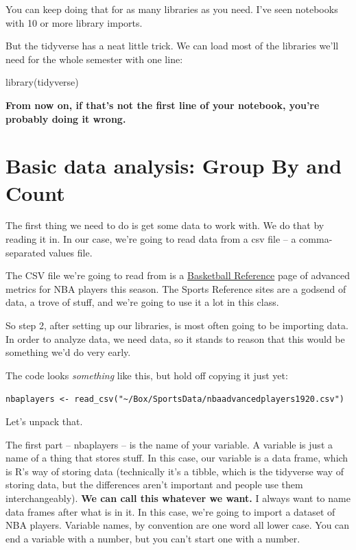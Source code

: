 \documentclass[
]{book}
\newenvironment{Shaded}{\begin{snugshade}}{\end{snugshade}}
\newcommand{\FunctionTok}[1]{\textcolor[rgb]{0.00,0.00,0.00}{#1}}
\newcommand{\NormalTok}[1]{#1}
\begin{document}
You can keep doing that for as many libraries as you need. I've seen notebooks with 10 or more library imports.

But the tidyverse has a neat little trick. We can load most of the libraries we'll need for the whole semester with one line:

\begin{Shaded}
\begin{Highlighting}[]
\FunctionTok{library}\NormalTok{(tidyverse)}
\end{Highlighting}
\end{Shaded}

\textbf{From now on, if that's not the first line of your notebook, you're probably doing it wrong.}

\hypertarget{basic-data-analysis-group-by-and-count}{%
\section{Basic data analysis: Group By and Count}\label{basic-data-analysis-group-by-and-count}}

The first thing we need to do is get some data to work with. We do that by reading it in. In our case, we're going to read data from a csv file -- a comma-separated values file.

The CSV file we're going to read from is a \href{https://www.basketball-reference.com/leagues/NBA_2020_advanced.html}{Basketball Reference} page of advanced metrics for NBA players this season. The Sports Reference sites are a godsend of data, a trove of stuff, and we're going to use it a lot in this class.

So step 2, after setting up our libraries, is most often going to be importing data. In order to analyze data, we need data, so it stands to reason that this would be something we'd do very early.

The code looks \emph{something} like this, but hold off copying it just yet:

\texttt{nbaplayers\ \textless{}-\ read\_csv("\textasciitilde{}/Box/SportsData/nbaadvancedplayers1920.csv")}

Let's unpack that.

The first part -- nbaplayers -- is the name of your variable. A variable is just a name of a thing that stores stuff. In this case, our variable is a data frame, which is R's way of storing data (technically it's a tibble, which is the tidyverse way of storing data, but the differences aren't important and people use them interchangeably). \textbf{We can call this whatever we want.} I always want to name data frames after what is in it. In this case, we're going to import a dataset of NBA players. Variable names, by convention are one word all lower case. You can end a variable with a number, but you can't start one with a number.
\end{document}
